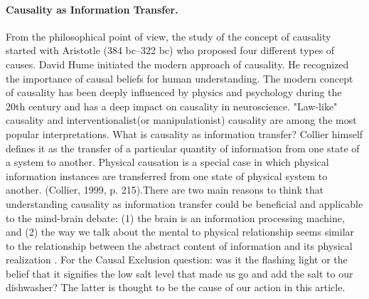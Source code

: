\paragraph{Causality as Information Transfer.}  From the philosophical point of view, the study of the concept of causality started with Aristotle (384 bc–322 bc) who proposed four different types of causes. David Hume initiated the modern approach of causality. He recognized the importance of causal beliefs for human understanding. The modern concept of causality has been deeply influenced by physics and psychology during the 20th century and has a deep impact on causality in neuroscience. "Law-like" causality and interventionalist(or manipulationist) causality are among the most popular interpretations.  What is causality as information transfer? Collier himself defines it as the transfer of a particular quantity of information from one state of a system to another\cite{collier1999causation}. Physical causation is a special case in which physical information instances are transferred from one state of physical system to another. (Collier, 1999, p. 215).There are two main reasons to think that understanding causality as information transfer could be beneficial and applicable to the mind-brain debate: (1) the brain is an information processing machine, and (2) the way we talk about the mental to physical relationship seems similar to the relationship between the abstract content of information and its physical realization \cite{feltz2019free}. For the Causal Exclusion question: was it the flashing light or the belief that it signifies the low salt level that made us go and add the salt to our dishwasher? {{The latter is thought to be the cause of our action in this article}}.





